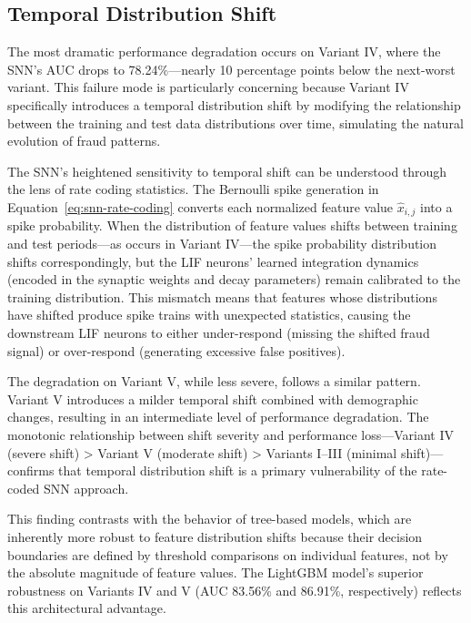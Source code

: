 \subsection{Temporal Distribution Shift}
\label{sec:snn-temporal-shift}

The most dramatic performance degradation occurs on Variant IV, where the SNN's AUC drops to 78.24\%---nearly 10 percentage points below the next-worst variant. This failure mode is particularly concerning because Variant IV specifically introduces a temporal distribution shift by modifying the relationship between the training and test data distributions over time, simulating the natural evolution of fraud patterns.

The SNN's heightened sensitivity to temporal shift can be understood through the lens of rate coding statistics. The Bernoulli spike generation in Equation~\ref{eq:snn-rate-coding} converts each normalized feature value $\hat{x}_{i,j}$ into a spike probability. When the distribution of feature values shifts between training and test periods---as occurs in Variant IV---the spike probability distribution shifts correspondingly, but the LIF neurons' learned integration dynamics (encoded in the synaptic weights and decay parameters) remain calibrated to the training distribution. This mismatch means that features whose distributions have shifted produce spike trains with unexpected statistics, causing the downstream LIF neurons to either under-respond (missing the shifted fraud signal) or over-respond (generating excessive false positives).

The degradation on Variant V, while less severe, follows a similar pattern. Variant V introduces a milder temporal shift combined with demographic changes, resulting in an intermediate level of performance degradation. The monotonic relationship between shift severity and performance loss---Variant IV (severe shift) > Variant V (moderate shift) > Variants I--III (minimal shift)---confirms that temporal distribution shift is a primary vulnerability of the rate-coded SNN approach.

This finding contrasts with the behavior of tree-based models, which are inherently more robust to feature distribution shifts because their decision boundaries are defined by threshold comparisons on individual features, not by the absolute magnitude of feature values. The LightGBM model's superior robustness on Variants IV and V (AUC 83.56\% and 86.91\%, respectively) reflects this architectural advantage.

